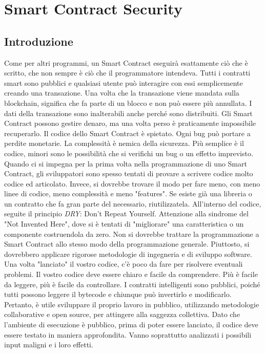 \chapter{Smart Contract Security}

\section{Introduzione}

Come per altri programmi, un Smart Contract eseguirà esattamente ciò che è scritto,
che non sempre è ciò che il programmatore intendeva. Tutti i contratti smart sono
pubblici e qualsiasi utente può interagire con essi semplicemente creando una
transazione.
Una volta che la transazione viene mandata sulla blockchain, significa che fa parte
di un blocco e non può essere più annullata.
I dati della transazione sono inalterabili anche perché
sono distribuiti.
Gli Smart Contract possono gestire denaro, ma una volta perso è praticamente
impossibile recuperarlo.
Il codice dello Smart Contract è spietato. Ogni bug può portare a perdite
monetarie.
La complessità è nemica della sicurezza. Più semplice è il codice,
minori sono le possibilità
che si verifichi un bug o un effetto imprevisto. Quando ci si impegna per la
prima volta nella
programmazione di uno Smart Contract, gli sviluppatori sono spesso tentati di
provare a scrivere codice molto codice ed articolato.
Invece, si dovrebbe trovare il modo per fare meno, con meno linee di
codice, meno complessità e meno "features".
Se esiste già una libreria o un contratto che fa gran parte del necessario,
riutilizzatela.
All'interno del codice, seguite il principio \textit{DRY}: Don't Repeat Yourself.
Attenzione alla sindrome del "Not Invented Here", dove si è tentati di
"migliorare" una caratteristica o un componente costruendola da zero.
Non si dovrebbe trattare la programmazione a Smart Contract allo stesso modo della
programmazione generale. Piuttosto, si dovrebbero applicare rigorose metodologie di
ingegneria e di sviluppo software.
Una volta "lanciato" il vostro codice, c'è poco da fare per risolvere eventuali
problemi.
Il vostro codice deve essere chiaro e facile da comprendere.
Più è facile da leggere, più è
facile da controllare.
I contratti intelligenti sono pubblici, poiché tutti possono leggere il bytecode
e chiunque può
invertirlo e modificarlo. Pertanto, è utile sviluppare il proprio lavoro in
pubblico, utilizzando
metodologie collaborative e open source, per attingere alla saggezza collettiva.
Dato che l'ambiente di esecuzione è pubblico, prima di poter essere lanciato,
il codice deve essere
testato in maniera approfondita.
Vanno soprattutto analizzati i possibili input maligni e i loro effetti.

